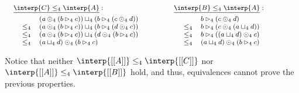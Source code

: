 \begin{example}
\begin{center}
  \begin{math}
    \footnotesize
    \begin{array}{lll}
      \begin{array}{lll}
        \underline{\interp{C} \leq_4 \interp{A}}:\\[4px]
        \,\,\,\,\begin{array}{rl}
               & (a \odot_4 (b \rhd_4 c)) \sqcup_4 (b \rhd_4 (c \odot_4 d))\\
        \leq_4 &  (a \odot_4 (b \rhd_4 c)) \sqcup_4 (b \rhd_4 (d \odot_4 c))\\
        \leq_4 &  (a \odot_4 (b \rhd_4 c)) \sqcup_4 (d \odot_4 (b \rhd_4 c))\\
        \leq_4 &  (a \sqcup_4 d) \odot_4 (b \rhd_4 c)\\
        \end{array}
      \end{array}
      & \quad &
      \begin{array}{lll}
        \underline{\interp{B} \leq_4 \interp{A}}:\\[4px]
        \,\,\,\,\,\begin{array}{lll}
               & b \rhd_4 (c \odot_4 d)\\
        \leq_4 &  b \rhd_4 (c \odot_4 (a \sqcup_4 d))\\
        \leq_4 &  b \rhd_4 ((a \sqcup_4 d) \odot_4 c)\\
        \leq_4 & (a \sqcup_4 d) \odot_4 (b \rhd_4 c)\\
        \end{array}
      \end{array}
    \end{array}
  \end{math}
\end{center}
Notice that neither $\interp{[[A]]} \leq_4 \interp{[[C]]}$ nor $\interp{[[A]]} \leq_4 \interp{[[B]]}$
hold, and thus, equivalences cannot prove the previous properties.
\end{example}



